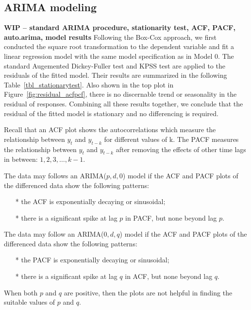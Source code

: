 \documentclass [11pt, proquest] {uwthesis}[2015/03/03]
\begin{document}
\subsection{ARIMA modeling}
\textbf{WIP -- standard ARIMA procedure, stationarity test, ACF, PACF, auto.arima, model results}
Following the Box-Cox approach, we first conducted the square root transformation to the dependent variable and fit a linear regression model with the same model specification as in Model 0. The standard Augemented Dickey-Fuller test and KPSS test are applied to the residuals of the fitted model. Their results are summarized in the following Table~\ref{tbl_stationarytest}. Also shown in the top plot in Figure~\ref{fig:residual_acfpcf}, there is no discernable trend or seasonality in the residual of responses. Combining all these results together, we conclude that the residual of the fitted model is stationary and no differencing is required. 

Recall that an ACF plot shows the autocorrelations which measure the relationship between $y_t$ and $y_{t-k}$ for different values of k.  The PACF measures the relationship between $y_t$ and $y_{t-k}$ after removing the effects of other time lags in between: $1, 2, 3, \hdots, k-1$.

The data may follows an ARIMA($p,d,0$) model if the ACF and PACF plots of the differenced data show the following patterns:
\begin{enumerate}
\item[*] the ACF is exponentially decaying or sinusoidal;
\item[*] there is a significant spike at lag $p$ in PACF, but none beyond lag $p$.
\end{enumerate}

The data may follow an ARIMA($0,d,q$) model if the ACF and PACF plots of the differenced data show the following patterns:
\begin{enumerate}
\item[*] the PACF is exponentially decaying or sinusoidal;
\item[*] there is a significant spike at lag $q$ in ACF, but none beyond lag $q$.
\end{enumerate}

When both $p$ and $q$ are positive, then the plots are not helpful in finding the suitable values of $p$ and $q$.
\end{document}
